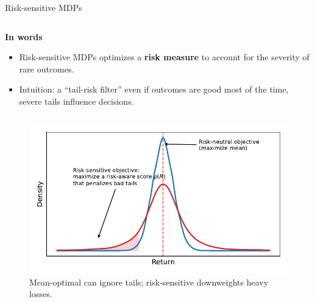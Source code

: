 \documentclass[lecture]{beamer}
\begin{document}
\begin{frame}{\normalsize Risk-sensitive MDPs}
\footnotesize

\begin{columns}
\begin{alertblock}{}
\textbf{In words}
\begin{itemize}
  \item Risk-sensitive MDPs optimizes a \textbf{risk measure} to account for the severity of rare outcomes.
  \item Intuition: a “tail-risk filter”  even if outcomes are good most of the time, severe tails influence decisions.
\end{itemize}
\end{alertblock}

\end{columns}

\vspace{0.2cm}
\begin{columns}[t]
\vspace{-.1cm}
\begin{figure}
  \centering
  \includegraphics[width=0.95\linewidth]{Codes/Risk/HeavyTail_vs_Mean.pdf}
  \centering\caption*{\scriptsize Mean-optimal can ignore tails; risk-sensitive downweights heavy losses.}
\end{figure}


\end{columns}
\end{frame}
\end{document}

